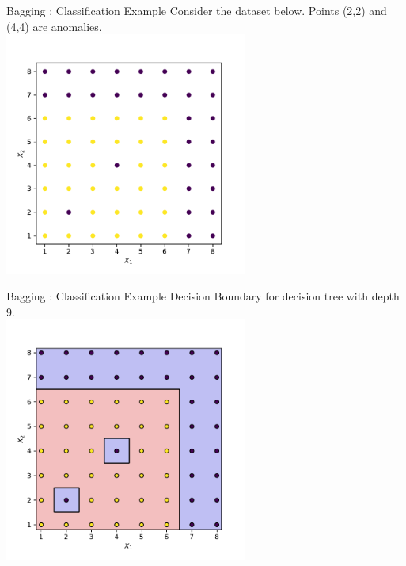\documentclass{beamer}
\begin{document}
	\begin{frame}{Bagging : Classification Example}
	Consider the dataset below. Points (2,2) and (4,4) are anomalies.\\
	\vspace{0.5cm}
	\centering
	\includegraphics[width = 0.6\textwidth]{dataset}
	\end{frame}


	\begin{frame}{Bagging : Classification Example}
	Decision Boundary for decision tree with depth 9.\\
	\vspace{0.5cm}
	\centering
	\includegraphics[width = 0.6\textwidth]{strong-tree}
	\end{frame}
	
\end{document}
